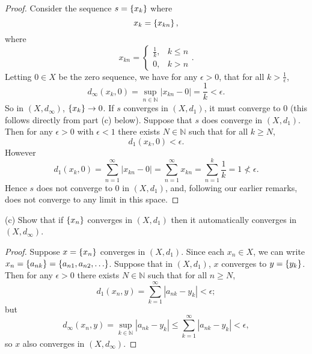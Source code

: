 \documentclass{article}
\newcommand{\N}{\mathbb{N}}
\begin{document}
\begin{proof}

Consider the sequence $s = \cbr{x_k}$ where
%
\begin{equation*}
    x_k = \cbr{x_{kn}}
    ,
\end{equation*}
%
where
%
\begin{equation*}
    x_{kn} = \begin{cases}
        \frac{1}{k}, &k \leq n \\
        0, &k > n
    \end{cases}
    .
\end{equation*}
%
Letting $0 \in X$ be the zero sequence, we have for any $\epsilon > 0$,
that for all $k > \frac{1}{\epsilon}$,
%
\begin{equation*}
    d_\infty(x_k, 0) = \sup_{n \in \N} |x_{kn} - 0| = \frac{1}{k} < \epsilon
    .
\end{equation*}
%
So in $(X, d_\infty)$, $\cbr{x_k} \to 0$. If $s$ converges in $(X,
d_1)$, it must converge to $0$ (this follows directly from part (c)
below). Suppose that $s$ does converge in $(X, d_1)$. Then for any
$\epsilon > 0$ with $\epsilon < 1$ there exists $N \in \N$ such that for all $k \geq N$,
%
\begin{equation*}
    d_1(x_k, 0) < \epsilon
    .
\end{equation*}
%
However
%
\begin{equation*}
    d_1(x_k, 0)
        = \sum_{n = 1}^\infty |x_{kn} - 0|
        = \sum_{n = 1}^\infty x_{kn}
        = \sum_{n = 1}^k \frac{1}{k}
        = 1
        \not< \epsilon
    .
\end{equation*}
%
Hence $s$ does not converge to $0$ in $(X, d_1)$, and, following our
earlier remarks, does not converge to any limit in this space.

\end{proof}

\newpage

(c) Show that if $\cbr{x_n}$ converges in $(X, d_1)$ then it
automatically converges in $(X, d_{\infty})$.

\begin{proof}

Suppose $x = \cbr{x_n}$ converges in $(X, d_1)$. Since each $x_n \in X$,
we can write $x_n = \cbr{a_{nk}} = \cbr{a_{n1}, a_{n2}, \ldots}$.
Suppose that in $(X, d_1)$, $x$ converges to $y = \cbr{y_k}$. Then for
any $\epsilon > 0$ there exists $N \in \N$ such that for all $n \geq N$,
%
\begin{equation*}
    d_1(x_n, y)
    = \sum_{k = 1}^\infty |a_{nk} - y_k|
    < \epsilon
    ;
\end{equation*}
%
but
%
\begin{equation*}
    d_\infty(x_n, y)
    = \sup_{k \in \N} |a_{nk} - y_k|
    \leq \sum_{k = 1}^\infty |a_{nk} - y_k|
    < \epsilon
    ,
\end{equation*}
%
so $x$ also converges in $(X, d_\infty)$.

\end{proof}
\end{document}
